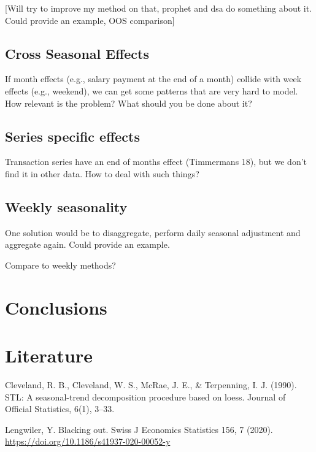 {[}Will try to improve my method on that, prophet and dsa do something
about it. Could provide an example, OOS comparison{]}

\hypertarget{cross-seasonal-effects}{%
\subsection{Cross Seasonal Effects}\label{cross-seasonal-effects}}

If month effects (e.g., salary payment at the end of a month) collide
with week effects (e.g., weekend), we can get some patterns that are
very hard to model. How relevant is the problem? What should you be done
about it?

\hypertarget{series-specific-effects}{%
\subsection{Series specific effects}\label{series-specific-effects}}

Transaction series have an end of months effect (Timmermans 18), but we
don't find it in other data. How to deal with such things?

\hypertarget{weekly-seasonality}{%
\subsection{Weekly seasonality}\label{weekly-seasonality}}

One solution would be to disaggregate, perform daily seasonal adjustment
and aggregate again. Could provide an example.

Compare to weekly methods?

\hypertarget{conclusions-1}{%
\section{Conclusions}\label{conclusions-1}}

\hypertarget{literature}{%
\section{Literature}\label{literature}}

Cleveland, R. B., Cleveland, W. S., McRae, J. E., \& Terpenning, I. J.
(1990). STL: A seasonal-trend decomposition procedure based on loess.
Journal of Official Statistics, 6(1), 3--33.

Lengwiler, Y. Blacking out. Swiss J Economics Statistics 156, 7 (2020).
\url{https://doi.org/10.1186/s41937-020-00052-y}


